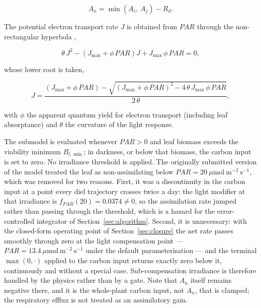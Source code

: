 \documentclass[a4paper,fleqn]{cas-sc}
\begin{document}
\begin{equation}
A_n = \min(A_c,\,A_j) - R_d.
\label{eq:An}
\end{equation}

The potential electron transport rate $J$ is obtained from $\mathit{PAR}$
through the non-rectangular hyperbola \citep{Farquhar1980,Farquhar1984},

\begin{equation}
\theta\,J^{2} - \left(J_{\max} + \phi\,\mathit{PAR}\right) J
+ J_{\max}\,\phi\,\mathit{PAR} = 0,
\label{eq:J_nrh}
\end{equation}

whose lower root is taken,

\begin{equation}
J =
\frac{\left(J_{\max}+\phi\,\mathit{PAR}\right)
- \sqrt{\left(J_{\max}+\phi\,\mathit{PAR}\right)^{2}
- 4\,\theta\,J_{\max}\,\phi\,\mathit{PAR}}}
{2\,\theta},
\label{eq:J_root}
\end{equation}

with $\phi$ the apparent quantum yield for electron transport (including
leaf absorptance) and $\theta$ the curvature of the light response.

The submodel is evaluated whenever $\mathit{PAR}>0$ and leaf biomass exceeds
the viability minimum $B_{l,\min}$; in darkness, or below that biomass, the
carbon input is set to zero. No irradiance threshold is applied. The
originally submitted version of the model treated the leaf as
non-assimilating below $\mathit{PAR} = 20\ \mu\mathrm{mol\ m^{-2}\ s^{-1}}$,
which was removed for two reasons. First, it was a discontinuity in the
carbon input at a point every diel trajectory crosses twice a day: the
light modifier at that irradiance is $f_{\mathit{PAR}}(20)=0.0374 \neq 0$, so
the assimilation rate jumped rather than passing through the threshold, which
is a hazard for the error-controlled integrator of
Section~\ref{sec:algorithm}. Second, it is unnecessary: with the closed-form
operating point of Section~\ref{sec:closure} the net rate passes smoothly
through zero at the light compensation point --- $\mathit{PAR} = 13.4\
\mu\mathrm{mol\ m^{-2}\ s^{-1}}$ under the default parameterisation --- and
the terminal $\max(0,\cdot)$ applied to the carbon input returns exactly zero
below it, continuously and without a special case. Sub-compensation
irradiance is therefore handled by the physics rather than by a gate. Note
that $A_n$ itself remains negative there, and it is the whole-plant carbon
input, not $A_n$, that is clamped; the respiratory efflux is not treated as
an assimilatory gain.
\end{document}
